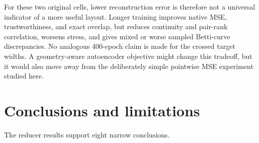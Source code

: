 \documentclass[10pt]{article}
\begin{document}
For these two original cells, lower reconstruction error is therefore not a universal
indicator of a more useful layout.  Longer training improves native MSE,
trustworthiness, and exact overlap, but reduces continuity and pair-rank correlation,
worsens stress, and gives mixed or worse sampled Betti-curve discrepancies.  No analogous
400-epoch claim is made for the crossed target widths.  A geometry-aware autoencoder
objective might change this tradeoff, but it would also move away from the deliberately
simple pointwise MSE experiment studied here.

\section{Conclusions and limitations}

The reducer results support eight narrow conclusions.
\end{document}
